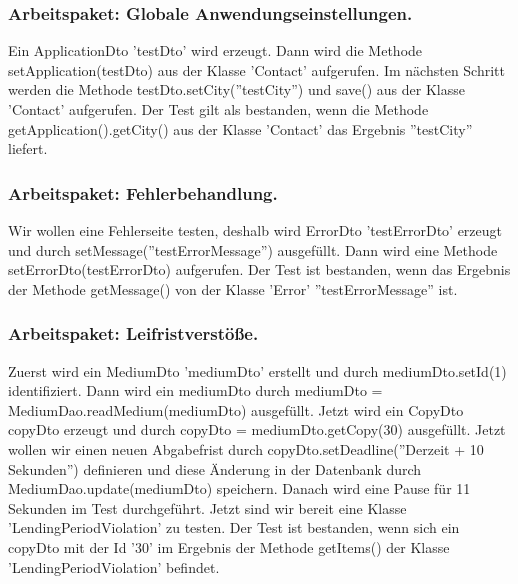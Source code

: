 \documentclass{article}
\begin{document}
\subsubsection{Arbeitspaket: Globale Anwendungseinstellungen.}
Ein ApplicationDto 'testDto' wird erzeugt. Dann wird die Methode setApplication(testDto) aus der Klasse 'Contact' aufgerufen. Im nächsten Schritt werden die Methode testDto.setCity(''testCity'') und save() aus der Klasse 'Contact' aufgerufen. Der Test gilt als bestanden, wenn die Methode getApplication().getCity() aus der Klasse 'Contact' das Ergebnis ''testCity'' liefert.

\subsubsection{Arbeitspaket: Fehlerbehandlung.}
Wir wollen eine Fehlerseite testen, deshalb wird ErrorDto 'testErrorDto' erzeugt und durch setMessage(''testErrorMessage'') ausgefüllt. Dann wird eine Methode setErrorDto(testErrorDto) aufgerufen. Der Test ist bestanden, wenn das Ergebnis der Methode getMessage() von der Klasse 'Error' ''testErrorMessage'' ist.

\subsubsection{Arbeitspaket: Leifristverstöße.}
Zuerst wird ein MediumDto 'mediumDto' erstellt und durch mediumDto.setId(1) identifiziert. Dann wird ein mediumDto durch mediumDto = MediumDao.readMedium(mediumDto) ausgefüllt. Jetzt wird ein CopyDto copyDto erzeugt und durch copyDto = mediumDto.getCopy(30) ausgefüllt. Jetzt wollen wir einen neuen Abgabefrist durch copyDto.setDeadline(''Derzeit + 10 Sekunden'') definieren und diese Änderung in der Datenbank durch MediumDao.update(mediumDto) speichern. Danach wird eine Pause für 11 Sekunden im Test durchgeführt. Jetzt sind wir bereit eine Klasse 'LendingPeriodViolation' zu testen. Der Test ist bestanden, wenn sich ein copyDto mit der Id '30' im Ergebnis der Methode getItems() der Klasse 'LendingPeriodViolation' befindet.
\end{document}
